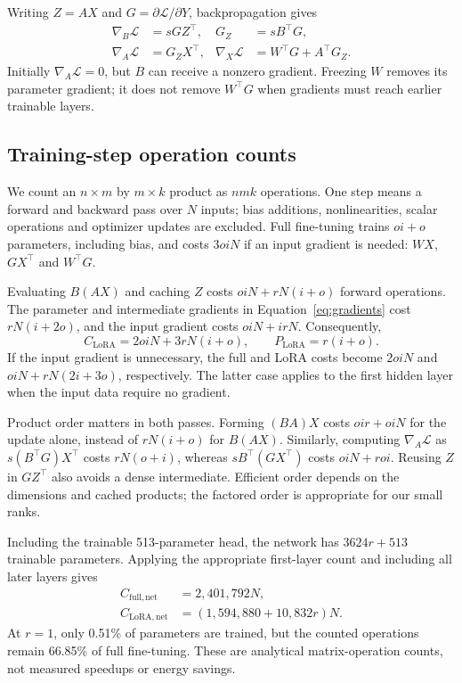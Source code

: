 \documentclass{article}
\begin{document}
Writing $Z=AX$ and $G=\partial\mathcal L/\partial Y$, backpropagation gives
\begin{align}
\nabla_B\mathcal L&=sGZ^\top,& G_Z&=sB^\top G,\nonumber\\
\nabla_A\mathcal L&=G_ZX^\top,&\nabla_X\mathcal L&=W^\top G+A^\top G_Z.
\label{eq:gradients}
\end{align}
Initially $\nabla_A\mathcal L=0$, but $B$ can receive a nonzero gradient. Freezing $W$ removes its parameter gradient; it does not remove $W^\top G$ when gradients must reach earlier trainable layers.

\subsection{Training-step operation counts}
We count an $n\times m$ by $m\times k$ product as $nmk$ operations. One step means a forward and backward pass over $N$ inputs; bias additions, nonlinearities, scalar operations and optimizer updates are excluded. Full fine-tuning trains $oi+o$ parameters, including bias, and costs $3oiN$ if an input gradient is needed: $WX$, $GX^\top$ and $W^\top G$.

Evaluating $B(AX)$ and caching $Z$ costs $oiN+rN(i+o)$ forward operations. The parameter and intermediate gradients in Equation~\ref{eq:gradients} cost $rN(i+2o)$, and the input gradient costs $oiN+irN$. Consequently,
\begin{equation}
C_{\mathrm{LoRA}}=2oiN+3rN(i+o),\qquad
P_{\mathrm{LoRA}}=r(i+o).
\label{eq:cost}
\end{equation}
If the input gradient is unnecessary, the full and LoRA costs become $2oiN$ and $oiN+rN(2i+3o)$, respectively. The latter case applies to the first hidden layer when the input data require no gradient.

Product order matters in both passes. Forming $(BA)X$ costs $oir+oiN$ for the update alone, instead of $rN(i+o)$ for $B(AX)$. Similarly, computing $\nabla_A\mathcal L$ as $s(B^\top G)X^\top$ costs $rN(o+i)$, whereas $sB^\top(GX^\top)$ costs $oiN+roi$. Reusing $Z$ in $GZ^\top$ also avoids a dense intermediate. Efficient order depends on the dimensions and cached products; the factored order is appropriate for our small ranks.

Including the trainable 513-parameter head, the network has $3624r+513$ trainable parameters. Applying the appropriate first-layer count and including all later layers gives
\begin{align}
C_{\mathrm{full,net}}&=2{,}401{,}792N,\nonumber\\
C_{\mathrm{LoRA,net}}&=(1{,}594{,}880+10{,}832r)N.
\label{eq:networkcost}
\end{align}
At $r=1$, only 0.51\% of parameters are trained, but the counted operations remain 66.85\% of full fine-tuning. These are analytical matrix-operation counts, not measured speedups or energy savings.
\end{document}
